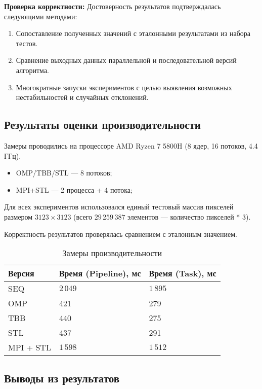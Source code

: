 \documentclass[12pt]{article}
\begin{document}
\textbf{Проверка корректности:}
Достоверность результатов подтверждалась следующими методами:
\begin{enumerate}
	\item Сопоставление полученных значений с эталонными результатами из набора тестов.
	\item Сравнение выходных данных параллельной и последовательной версий алгоритма.
	\item Многократные запуски экспериментов с целью выявления возможных нестабильностей и случайных отклонений.
\end{enumerate}

\subsection{Результаты оценки производительности}

Замеры проводились на процессоре AMD Ryzen 7 5800H (8 ядер, 16 потоков, 4.4 ГГц).

\begin{itemize}
\item OMP/TBB/STL --- 8 потоков;
\item MPI+STL --- 2 процесса + 4 потока;
\end{itemize}

Для всех экспериментов использовался единый тестовый массив пикселей размером $3123 \times 3123$ (всего $29\,259\,387$ элементов --- количество пикселей * 3).

Корректность результатов проверялась сравнением с эталонным значением.

\begin{table}[H]
	\centering
	\begin{tabular}{|l|l|l|}
		\hline
		\textbf{Версия} & \textbf{Время (Pipeline), мс} & \textbf{Время (Task), мс} \\
		\hline
		SEQ & $2\,049$ & $1\,895$ \\
		OMP & 421 & 279 \\
		TBB & 440 & 275 \\
		STL & 437 & 291 \\
		MPI + STL & $1\,598$ & $1\,512$ \\
		\hline
	\end{tabular}
	\caption{Замеры производительности}
\end{table}

\subsection{Выводы из результатов}
\end{document}
